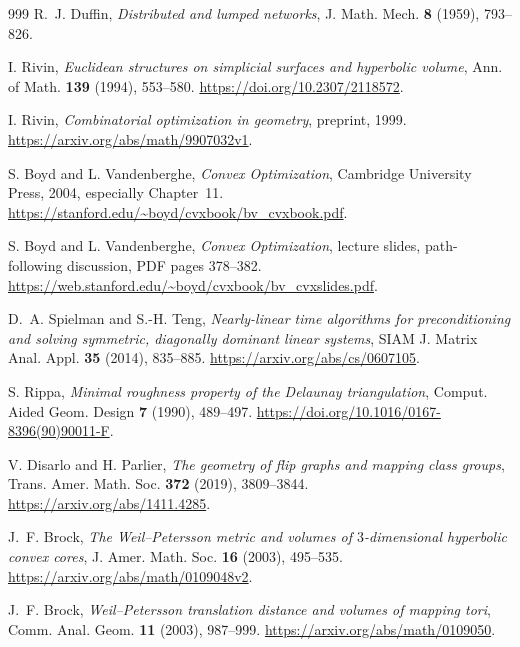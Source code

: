 \documentclass[11pt,a4paper]{article}
\numberwithin{equation}{section}
\theoremstyle{definition}
\theoremstyle{remark}
\begin{document}
\begin{thebibliography}{999}
R.~J. Duffin,
\emph{Distributed and lumped networks},
J. Math. Mech. \textbf{8} (1959), 793--826.

I. Rivin,
\emph{Euclidean structures on simplicial surfaces and hyperbolic volume},
Ann. of Math. \textbf{139} (1994), 553--580.
\url{https://doi.org/10.2307/2118572}.

I. Rivin,
\emph{Combinatorial optimization in geometry}, preprint, 1999.
\url{https://arxiv.org/abs/math/9907032v1}.

S. Boyd and L. Vandenberghe,
\emph{Convex Optimization}, Cambridge University Press, 2004,
especially Chapter~11.
\url{https://stanford.edu/~boyd/cvxbook/bv_cvxbook.pdf}.

S. Boyd and L. Vandenberghe,
\emph{Convex Optimization}, lecture slides, path-following discussion,
PDF pages 378--382.
\url{https://web.stanford.edu/~boyd/cvxbook/bv_cvxslides.pdf}.

D.~A. Spielman and S.-H. Teng,
\emph{Nearly-linear time algorithms for preconditioning and solving
symmetric, diagonally dominant linear systems},
SIAM J. Matrix Anal. Appl. \textbf{35} (2014), 835--885.
\url{https://arxiv.org/abs/cs/0607105}.

S. Rippa,
\emph{Minimal roughness property of the Delaunay triangulation},
Comput. Aided Geom. Design \textbf{7} (1990), 489--497.
\url{https://doi.org/10.1016/0167-8396(90)90011-F}.

V. Disarlo and H. Parlier,
\emph{The geometry of flip graphs and mapping class groups},
Trans. Amer. Math. Soc. \textbf{372} (2019), 3809--3844.
\url{https://arxiv.org/abs/1411.4285}.

J.~F. Brock,
\emph{The Weil--Petersson metric and volumes of $3$-dimensional hyperbolic
convex cores},
J. Amer. Math. Soc. \textbf{16} (2003), 495--535.
\url{https://arxiv.org/abs/math/0109048v2}.

J.~F. Brock,
\emph{Weil--Petersson translation distance and volumes of mapping tori},
Comm. Anal. Geom. \textbf{11} (2003), 987--999.
\url{https://arxiv.org/abs/math/0109050}.

\end{thebibliography}
\end{document}
